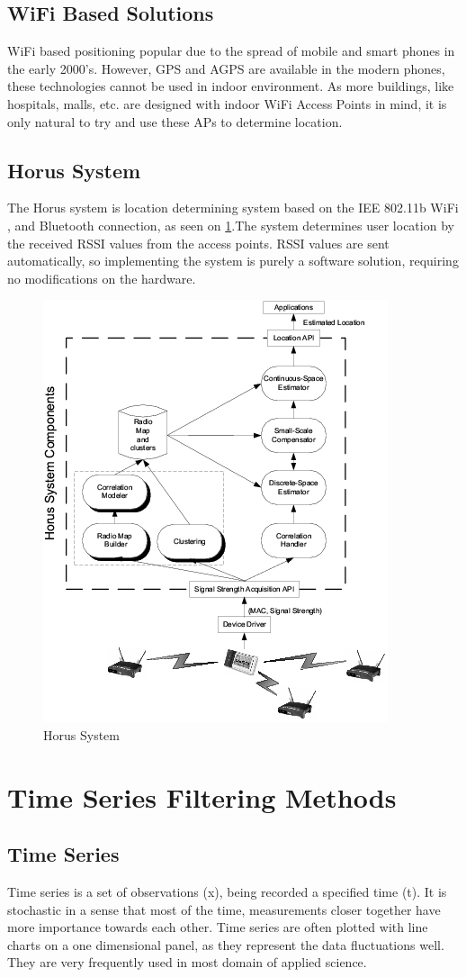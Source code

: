 \subsection{WiFi Based Solutions}
WiFi \cite{chen2002signal}based positioning popular due to the spread of mobile and smart phones in the early 2000's. However, GPS and AGPS are available in the modern phones, these technologies cannot be used in indoor environment. As more buildings, like hospitals, malls, etc. are designed with indoor WiFi Access Points in mind, it is only natural to try and use these APs to determine location.
\subsection{Horus System}
The Horus\cite{youssef2005horus} system is location determining system based on the IEE 802.11b WiFi , and Bluetooth connection, as seen on \ref{fig:horusimage}.The system determines user location by the received RSSI values from the access points. RSSI values are sent automatically, so implementing the system is purely a software solution, requiring no modifications on the hardware.
\begin{figure}[!h]
	\centering
		\includegraphics[width=.55\linewidth]{figures/Horus.png}
		\caption{Horus System \cite{HORUS}}\label{fig:horusimage}
\end{figure}


\section{Time Series Filtering Methods}
\subsection{Time Series}
Time series \cite{kalman1960new}\cite{durbin2012time} is a set of observations (x), being recorded a specified time (t).
It is stochastic in a sense that most of the time, measurements closer together have more importance towards each other.
Time series are often plotted with line charts on a one dimensional panel, as they represent the data fluctuations well.
They are very frequently used in most domain of applied science.

